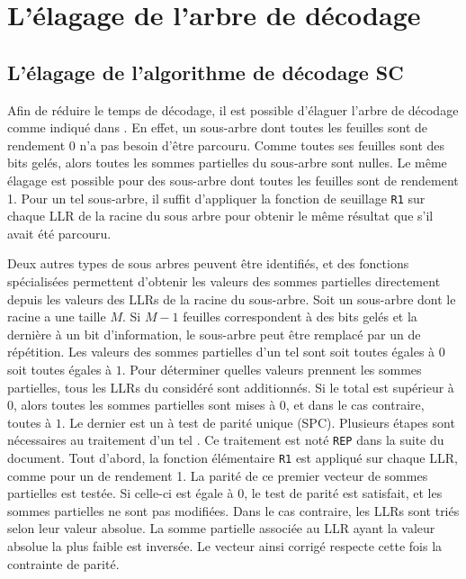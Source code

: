 


% 
% 
% 
% 	
% 
% 
% 

\section{L'élagage de l'arbre de décodage}


\subsection{L'élagage de l'algorithme de décodage SC}
Afin de réduire le temps de décodage, il est possible d'élaguer l'arbre de décodage comme indiqué dans \cite{alamdar-yazdi_simplified_2011}. En effet, un sous-arbre dont toutes les feuilles sont de rendement 0 n'a pas besoin d'être parcouru. Comme toutes ses feuilles sont des bits gelés, alors toutes les sommes partielles du sous-arbre sont nulles. Le même élagage est possible pour des sous-arbre dont toutes les feuilles sont de rendement 1. Pour un tel sous-arbre, il suffit d'appliquer la fonction de seuillage \texttt{R1} sur chaque LLR de la racine du sous arbre pour obtenir le même résultat que s'il avait été parcouru.

Deux autres types de sous arbres peuvent être identifiés, et des fonctions spécialisées permettent d'obtenir les valeurs des sommes partielles directement depuis les valeurs des LLRs de la racine du sous-arbre. Soit un sous-arbre dont le \noeud racine a une taille $M$. Si $M-1$ feuilles correspondent à des bits gelés et la dernière à un bit d'information, le sous-arbre peut être remplacé par un \noeud de répétition. Les valeurs des sommes partielles d'un tel \noeud sont soit toutes égales à $0$ soit toutes égales à $1$. Pour déterminer quelles valeurs prennent les sommes partielles, tous les LLRs du \noeud considéré sont additionnés. Si le total est supérieur à 0, alors toutes les sommes partielles sont mises à $0$, et dans le cas contraire, toutes à $1$. Le dernier est un \noeud à test de parité unique (SPC). Plusieurs étapes sont nécessaires au traitement d'un tel \noeud. Ce traitement est noté \texttt{REP} dans la suite du document. Tout d'abord, la fonction élémentaire \texttt{R1} est appliqué sur chaque LLR, comme pour un \noeud de rendement 1. La parité de ce premier vecteur de sommes partielles est testée. Si celle-ci est égale à 0, le test de parité est satisfait, et les sommes partielles ne sont pas modifiées. Dans le cas contraire, les LLRs sont triés selon leur valeur absolue. La somme partielle associée au LLR ayant la valeur absolue la plus faible est inversée. Le vecteur ainsi corrigé respecte cette fois la contrainte de parité.

